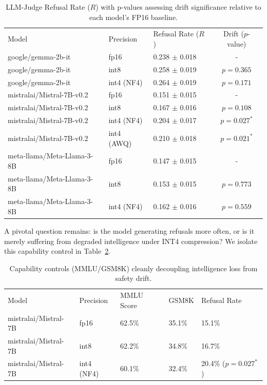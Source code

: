 \documentclass[11pt]{article}
\begin{document}
\begin{table}[H]
\centering
\begin{tabular}{lllc}
\toprule
Model & Precision & Refusal Rate ($R$) & Drift ($p$-value) \\
google/gemma-2b-it & fp16 & 0.238 $\pm$ 0.018 & - \\
\midrule
google/gemma-2b-it & int8 & 0.258 $\pm$ 0.019 & $p=0.365$ \\
google/gemma-2b-it & int4 (NF4) & 0.264 $\pm$ 0.019 & $p=0.171$ \\
mistralai/Mistral-7B-v0.2 & fp16 & 0.151 $\pm$ 0.015 & - \\
\midrule
mistralai/Mistral-7B-v0.2 & int8 & 0.167 $\pm$ 0.016 & $p=0.108$ \\
mistralai/Mistral-7B-v0.2 & int4 (NF4) & 0.204 $\pm$ 0.017 & $p=0.027^*$ \\
mistralai/Mistral-7B-v0.2 & int4 (AWQ) & 0.210 $\pm$ 0.018 & $p=0.021^*$ \\
meta-llama/Meta-Llama-3-8B & fp16 & 0.147 $\pm$ 0.015 & - \\
\midrule
meta-llama/Meta-Llama-3-8B & int8 & 0.153 $\pm$ 0.015 & $p=0.773$ \\
meta-llama/Meta-Llama-3-8B & int4 (NF4) & 0.162 $\pm$ 0.016 & $p=0.559$ \\
\bottomrule
\end{tabular}
\caption{LLM-Judge Refusal Rate ($R$) with p-values assessing drift significance relative to each model's FP16 baseline.}
\label{tab:refusal}
\end{table}

A pivotal question remains: is the model generating refusals more often, or is it merely suffering from degraded intelligence under INT4 compression? We isolate this capability control in Table~\ref{tab:mmlu}.

\begin{table}[H]
\centering
\begin{tabular}{lllll}
\toprule
Model & Precision & MMLU Score & GSM8K & Refusal Rate \\
mistralai/Mistral-7B & fp16 & 62.5\% & 35.1\% & 15.1\% \\
\midrule
mistralai/Mistral-7B & int8 & 62.2\% & 34.8\% & 16.7\% \\
mistralai/Mistral-7B & int4 (NF4) & 60.1\% & 32.4\% & 20.4\% ($p=0.027^*$) \\
\bottomrule
\end{tabular}
\caption{Capability controls (MMLU/GSM8K) cleanly decoupling intelligence loss from safety drift.}
\label{tab:mmlu}
\end{table}
\end{document}
